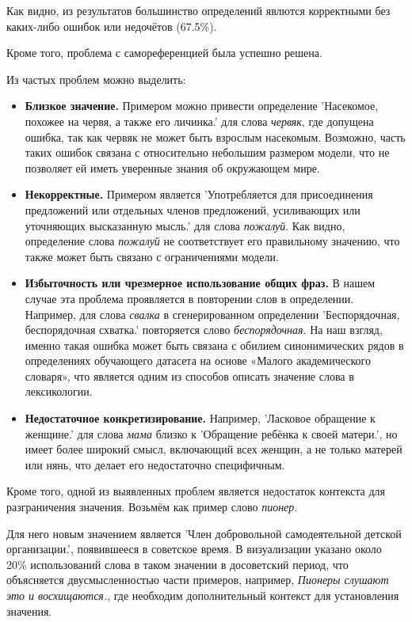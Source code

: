 \documentclass[LI,VKR]{HSEUniversity}
\begin{document}
Как видно, из результатов большинство определений явлются корректными
без каких-либо ошибок или недочётов (67.5\%).

Кроме того, проблема с самореференцией была успешно решена.

Из частых проблем можно выделить:
\begin{itemize}
    \item \textbf{Близкое значение.}
Примером можно привести определение ’Насекомое, похожее на червя, а также его личинка.’
для слова \textit{червяк},
где допущена ошибка, так как червяк не может быть взрослым насекомым.
Возможно, часть таких ошибок связана с относительно небольшим размером модели,
что не позволяет ей иметь уверенные знания об окружающем мире.

    \item \textbf{Некорректные.}
Примером является ’Употребляется для присоединения предложений или отдельных членов предложений,
усиливающих или уточняющих высказанную мысль.’
для слова \textit{пожалуй}.
Как видно, определение слова \textit{пожалуй} не соответствует его правильному значению,
что также может быть связано с ограничениями модели.

    \item \textbf{Избыточность или чрезмерное использование общих фраз.}
В нашем случае эта проблема проявляется в повторении слов в определении.
Например, для слова \textit{свалка} в сгенерированном определении ’Беспорядочная, беспорядочная схватка.’
повторяется слово \textit{беспорядочная}.
На наш взгляд, именно такая ошибка может быть связана с обилием синонимических рядов в определениях
обучающего датасета на основе «Малого академического словаря»,
что является одним из способов описать значение слова в лексикологии.

    \item \textbf{Недостаточное конкретизирование.}
Например, ’Ласковое обращение к женщине.’ для слова \textit{мама} близко к
’Обращение ребёнка к своей матери.’, но имеет более широкий смысл, включающий всех женщин,
а не только матерей или нянь, что делает его недостаточно специфичным. %
\end{itemize}

Кроме того, одной из выявленных проблем является недостаток контекста для разграничения значения.
Возьмём как пример слово \textit{пионер}.

Для него новым значением является ’Член добровольной самодеятельной детской организации.’,
появившееся в советское время.
В визуализации указано около 20\% использований слова в таком значении
в досоветский период, что объясняется двусмысленностью части примеров,
например, \textit{Пионеры слушают это и восхищаются.}, где необходим дополнительный контекст
для установления значения.
\end{document}
